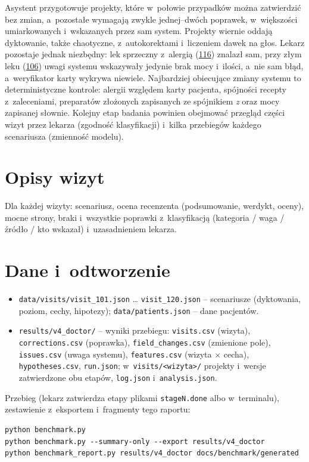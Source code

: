 \documentclass[11pt,a4paper]{article}
\newcommand{\wizyta}[1]{\hyperref[wizyta:#1]{#1}}
\begin{document}
Asystent przygotowuje projekty, które w~połowie przypadków można zatwierdzić bez zmian, a~pozostałe wymagają zwykle jednej--dwóch
poprawek, w~większości umiarkowanych i~wskazanych przez sam system. Projekty wiernie oddają dyktowanie, także chaotyczne,
z~autokorektami i~liczeniem dawek na głos. Lekarz pozostaje jednak niezbędny: lek sprzeczny z~alergią (\wizyta{116}) znalazł sam,
przy złym leku (\wizyta{106}) uwagi systemu wskazywały jedynie brak mocy i~ilości, a~nie sam błąd, a~weryfikator karty wykrywa niewiele. Najbardziej obiecujące zmiany systemu to deterministyczne
kontrole: alergii względem karty pacjenta, spójności recepty z~zaleceniami, preparatów złożonych zapisanych ze spójnikiem
\emph{z} oraz mocy zapisanej słownie. Kolejny etap badania powinien obejmować przegląd części wizyt przez lekarza
(zgodność klasyfikacji) i~kilka przebiegów każdego scenariusza (zmienność modelu).

\appendix
\section{Opisy wizyt}
Dla każdej wizyty: scenariusz, ocena recenzenta (podsumowanie, werdykt, oceny), mocne strony, braki i~wszystkie poprawki
z~klasyfikacją (kategoria / waga / źródło / kto wskazał) i~uzasadnieniem lekarza.

{\sloppy

\par}

\section{Dane i~odtworzenie}
{\sloppy
\begin{itemize}
  \item \texttt{data/visits/visit\_101.json} \ldots{} \texttt{visit\_120.json} -- scenariusze (dyktowania, poziom, cechy, hipotezy);
        \texttt{data/patients.json} -- dane pacjentów.
  \item \texttt{results/v4\_doctor/} -- wyniki przebiegu: \texttt{visits.csv} (wizyta), \texttt{corrections.csv} (poprawka),
        \texttt{field\_changes.csv} (zmienione pole), \texttt{issues.csv} (uwaga systemu), \texttt{features.csv} (wizyta $\times$ cecha),
        \texttt{hypotheses.csv}, \texttt{run.json}; w~\texttt{visits/<wizyta>/} projekty i~wersje zatwierdzone obu etapów,
        \texttt{log.json} i~\texttt{analysis.json}.
\end{itemize}
\par}
Przebieg (lekarz zatwierdza etapy plikami \texttt{stageN.done} albo w~terminalu), zestawienie z~eksportem i~fragmenty tego raportu:
\begin{verbatim}
python benchmark.py
python benchmark.py --summary-only --export results/v4_doctor
python benchmark_report.py results/v4_doctor docs/benchmark/generated
\end{verbatim}
\end{document}
